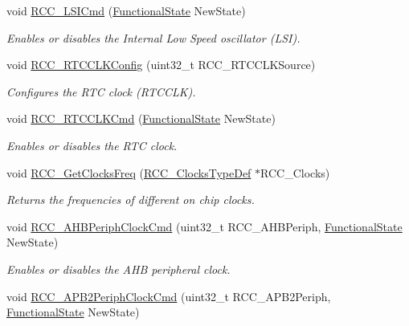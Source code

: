 \begin{DoxyCompactItemize}
void \mbox{\hyperlink{group___r_c_c___private___functions_ga81e3ca29fd154ac2019bba6936d6d5ed}{R\+C\+C\+\_\+\+L\+S\+I\+Cmd}} (\mbox{\hyperlink{group___exported__types_gac9a7e9a35d2513ec15c3b537aaa4fba1}{Functional\+State}} New\+State)
\begin{DoxyCompactList}\small\item\em Enables or disables the Internal Low Speed oscillator (L\+SI). \end{DoxyCompactList}\item 
void \mbox{\hyperlink{group___r_c_c___private___functions_ga1473d8a5a020642966359611c44181b0}{R\+C\+C\+\_\+\+R\+T\+C\+C\+L\+K\+Config}} (uint32\+\_\+t R\+C\+C\+\_\+\+R\+T\+C\+C\+L\+K\+Source)
\begin{DoxyCompactList}\small\item\em Configures the R\+TC clock (R\+T\+C\+C\+LK). \end{DoxyCompactList}\item 
void \mbox{\hyperlink{group___r_c_c___private___functions_ga9802f84846df2cea8e369234ed13b159}{R\+C\+C\+\_\+\+R\+T\+C\+C\+L\+K\+Cmd}} (\mbox{\hyperlink{group___exported__types_gac9a7e9a35d2513ec15c3b537aaa4fba1}{Functional\+State}} New\+State)
\begin{DoxyCompactList}\small\item\em Enables or disables the R\+TC clock. \end{DoxyCompactList}\item 
void \mbox{\hyperlink{group___r_c_c___private___functions_ga3e9944fd1ed734275222bbb3e3f29993}{R\+C\+C\+\_\+\+Get\+Clocks\+Freq}} (\mbox{\hyperlink{struct_r_c_c___clocks_type_def}{R\+C\+C\+\_\+\+Clocks\+Type\+Def}} $\ast$R\+C\+C\+\_\+\+Clocks)
\begin{DoxyCompactList}\small\item\em Returns the frequencies of different on chip clocks. \end{DoxyCompactList}\item 
void \mbox{\hyperlink{group___r_c_c___private___functions_gae0b30d8598b8393bdba9c3fefba3a968}{R\+C\+C\+\_\+\+A\+H\+B\+Periph\+Clock\+Cmd}} (uint32\+\_\+t R\+C\+C\+\_\+\+A\+H\+B\+Periph, \mbox{\hyperlink{group___exported__types_gac9a7e9a35d2513ec15c3b537aaa4fba1}{Functional\+State}} New\+State)
\begin{DoxyCompactList}\small\item\em Enables or disables the A\+HB peripheral clock. \end{DoxyCompactList}\item 
void \mbox{\hyperlink{group___r_c_c___private___functions_ga56ff55caf8d835351916b40dd030bc87}{R\+C\+C\+\_\+\+A\+P\+B2\+Periph\+Clock\+Cmd}} (uint32\+\_\+t R\+C\+C\+\_\+\+A\+P\+B2\+Periph, \mbox{\hyperlink{group___exported__types_gac9a7e9a35d2513ec15c3b537aaa4fba1}{Functional\+State}} New\+State)

\end{DoxyCompactItemize}
